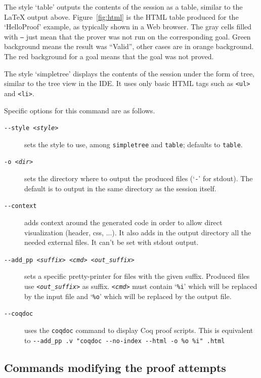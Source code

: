 The style `table' outputs the contents of the session as a table,
similar to the LaTeX output above. Figure~\ref{fig:html} is the HTML
table produced for the `HelloProof' example, as typically shown in a
Web browser. The gray cells filled with \texttt{---} just mean that
the prover was not run on the corresponding goal. Green background
means the result was ``Valid'', other cases are in orange
background. The red background for a goal means that the goal was not
proved.

The style `simpletree' displays the contents of the session under the
form of tree, similar to the tree view in the IDE. It uses only basic
HTML tags such as \verb|<ul>| and \verb|<li>|.

Specific options for this command are as follows.
\begin{description}
\item[\texttt{-{}-style \textsl{<style>}}] sets the style to use, among
  \texttt{simpletree} and \texttt{table}; defaults to
  \texttt{table}.

\item[\texttt{-o \textsl{<dir>}}] sets the directory where to output
  the produced files (`\texttt{-}' for stdout). The default is to output
  in the same directory as the session itself.

\item[\texttt{-{}-context}] adds context around the generated code in
  order to allow direct visualization (header, css, ...). It also adds
  in the output directory all the needed external files. It can't be set with
  stdout output.

\item[\texttt{-{}-add\_pp \textsl{<suffix>} \textsl{<cmd>} \textsl{<out\_suffix>}}] sets a specific
  pretty-printer for files with the given suffix. Produced files use
  \texttt{\textsl{<out\_suffix>}} as suffix. \texttt{\textsl{<cmd>}} must contain
  `\texttt{\%i}' which will be replaced by the input file and
  `\texttt{\%o}' which will be replaced by the output file.

\item[\texttt{-{}-coqdoc}] uses the \verb|coqdoc| command to display Coq proof
  scripts. This is equivalent to \texttt{-{}-add\_pp .v "coqdoc
    -{}-no-index -{}-html -o \%o \%i" .html}

\end{description}

\subsection{Commands modifying the proof attempts}

